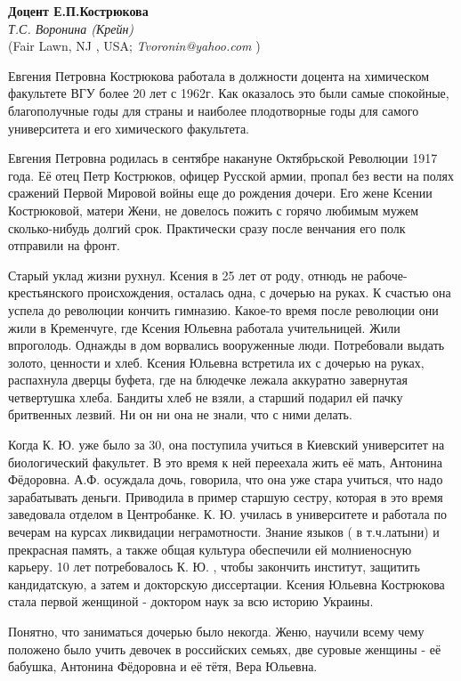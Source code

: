 \begin{center}{ \bf Доцент Е.П.Кострюкова }\\
{\it Т.С. Воронина (Крейн)} \\
(Fair Lawn, NJ , USA; {\it Tvoronin@yahoo.com} )
\end{center}
Евгения Петровна Кострюкова работала в должности доцента на химическом факультете ВГУ более 20 лет с 1962г. Как оказалось это были самые спокойные, благополучные годы для страны и наиболее плодотворные годы для самого университета и его химического факультета.

Евгения Петровна родилась в сентябре накануне Октябрьской Революции 1917 года. Её отец Петр Кострюков, офицер Русской армии, пропал без вести на полях сражений Первой Мировой войны еще до рождения дочери. Его жене Ксении Кострюковой, матери Жени, не довелось пожить с горячо любимым мужем сколько-нибудь долгий срок. Практически сразу после венчания его полк отправили на фронт.

Старый уклад жизни рухнул. Ксения в 25 лет от роду, отнюдь не рабоче-крестьянского происхождения, осталась одна, с дочерью на руках. К счастью она успела до революции кончить гимназию. Какое-то время после революции они жили в Кременчуге, где Ксения Юльевна работала учительницей. Жили впроголодь. Однажды в дом ворвались вооруженные люди. Потребовали выдать золото, ценности и хлеб. Ксения Юльевна встретила их с дочерью на руках, распахнула дверцы буфета, где на блюдечке лежала аккуратно завернутая четвертушка хлеба. Бандиты хлеб не взяли, а старший подарил ей пачку бритвенных лезвий. Ни он ни она не знали, что с ними делать.

Когда К. Ю. уже было за 30, она поступила учиться в Киевский университет на биологический факультет. В это время к ней переехала жить её мать, Антонина Фёдоровна. А.Ф. осуждала дочь, говорила, что она уже стара учиться, что надо зарабатывать деньги. Приводила в пример старшую сестру, которая в это время заведовала отделом в Центробанке. К. Ю. училась в университете и работала по вечерам на курсах ликвидации неграмотности. Знание языков ( в т.ч.латыни) и прекрасная память, а также общая культура обеспечили ей молниеносную карьеру. 10 лет потребовалось К. Ю. , чтобы закончить институт, защитить кандидатскую, а затем и докторскую диссертации. Ксения Юльевна Кострюкова стала первой женщиной - доктором наук за всю историю Украины.

Понятно, что заниматься дочерью было некогда. Женю, научили всему чему положено было учить девочек в российских семьях, две суровые женщины - её бабушка, Антонина Фёдоровна и её тётя, Вера Юльевна.

